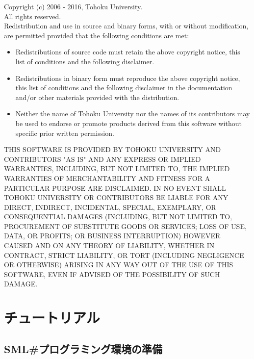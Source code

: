 \documentclass{jbook}
\newcommand{\txt}[2]{#1}
\newcommand{\smlsharp}{SML\#}
\begin{document}
Copyright (c) 2006 - 2016, Tohoku University.\\
All rights reserved.\\

Redistribution and use in source and binary forms, with or without
modification, are permitted provided that the following conditions are
met:

\begin{itemize}
\item 
  Redistributions of source code must retain the above copyright
  notice, this list of conditions and the following disclaimer. 
\item 
  Redistributions in binary form must reproduce the above
  copyright notice, this list of conditions and the following disclaimer
  in the documentation and/or other materials provided with the
  distribution. 
\item 
  Neither the name of Tohoku University nor the names of its
  contributors may be used to endorse or promote products derived from
  this software without specific prior written permission.  
\end{itemize}

THIS SOFTWARE IS PROVIDED BY TOHOKU UNIVERSITY AND CONTRIBUTORS "AS IS"
AND ANY EXPRESS OR IMPLIED WARRANTIES, INCLUDING, BUT NOT LIMITED TO,
THE IMPLIED WARRANTIES OF MERCHANTABILITY AND FITNESS FOR A PARTICULAR
PURPOSE ARE DISCLAIMED. IN NO EVENT SHALL TOHOKU UNIVERSITY OR
CONTRIBUTORS BE LIABLE FOR ANY DIRECT, INDIRECT, INCIDENTAL, SPECIAL,
EXEMPLARY, OR CONSEQUENTIAL DAMAGES (INCLUDING, BUT NOT LIMITED TO,
PROCUREMENT OF SUBSTITUTE GOODS OR SERVICES; LOSS OF USE, DATA, OR
PROFITS; OR BUSINESS INTERRUPTION) HOWEVER CAUSED AND ON ANY THEORY OF
LIABILITY, WHETHER IN CONTRACT, STRICT LIABILITY, OR TORT (INCLUDING
NEGLIGENCE OR OTHERWISE) ARISING IN ANY WAY OUT OF THE USE OF THIS
SOFTWARE, EVEN IF ADVISED OF THE POSSIBILITY OF SUCH DAMAGE.

% 
\part{\txt{チュートリアル}{Tutorials}}
\label{part:tutorial}

\chapter{\txt{\smlsharp{}プログラミング環境の準備}
{Setting up \smlsharp{} programming environment}
}
\label{chap:tutorialEnvironment}
\end{document}
